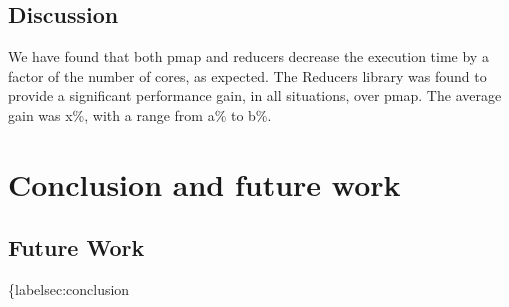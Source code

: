 \documentclass[12pt]{article}
\begin{document}
\subsection{Discussion}\label{sec:discussion}
We have found that both pmap and reducers decrease the execution time by a factor of the number of cores, as expected. The Reducers library was found to provide a significant performance gain, in all situations, over pmap. The average gain was x\%, with a range from a\% to b\%.

\section{Conclusion and future work}\label{sec:conclusion}

\subsection{Future Work}\{label{sec:conclusion}


%
%

%  
%
%




\end{document}
